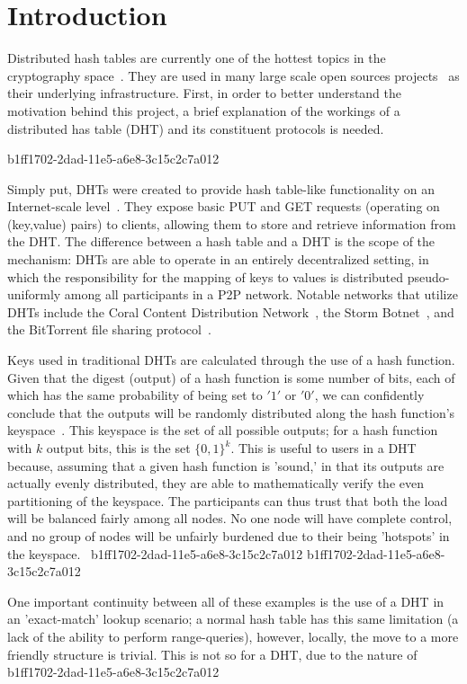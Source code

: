 \documentclass[12pt]{article}
\begin{document}
\section{Introduction}
\par Distributed hash tables are currently one of the hottest topics in the cryptography space~\cite{Stoica:2001dj,Rowstron:2001ea,Ratnasamy:2001wn}. They are used in many large scale open sources projects~\cite{Freitas:2013tb,Xu:2010vs,Perfitt:2010fh} as their underlying infrastructure. First, in order to better understand the motivation behind this project, a brief explanation of the workings of a distributed has table (DHT) and its constituent protocols is needed.

b1ff1702-2dad-11e5-a6e8-3c15c2c7a012\par Simply put, DHTs were created to provide hash table-like functionality on an Internet-scale level~\cite{Ratnasamy:2001wn}. They expose basic PUT and GET requests (operating on (key,value) pairs) to clients, allowing them to store and retrieve information from the DHT. The difference between a hash table and a DHT is the scope of the mechanism: DHTs are able to operate in an entirely decentralized setting, in which the responsibility for the mapping of keys to values is distributed pseudo-uniformly among all participants in a P2P network. Notable networks that utilize DHTs include the Coral Content Distribution Network~\cite{Freedman:2004vb}, the Storm Botnet~\cite{Holz:2008uk}, and the BitTorrent file sharing protocol~\cite{Cohen:y1_8mBnw}.

\par Keys used in traditional DHTs are calculated through the use of a hash function. Given that the digest (output) of a hash function is some number of bits, each of which has the same probability of being set to $'1'$ or $'0'$, we can confidently conclude that the outputs will be randomly distributed along the hash function's keyspace~. This keyspace is the set of all possible outputs; for a hash function with $k$ output bits, this is the set $\{0,1\}^k$. This is useful to users in a DHT because, assuming that a given hash function is 'sound,' in that its outputs are actually evenly distributed, they are able to mathematically verify the even partitioning of the keyspace. The participants can thus trust that both the load will be balanced fairly among all nodes. No one node will have complete control, and no group of nodes will be unfairly burdened due to their being 'hotspots' in the keyspace.~
b1ff1702-2dad-11e5-a6e8-3c15c2c7a012
b1ff1702-2dad-11e5-a6e8-3c15c2c7a012\par One important continuity between all of these examples is the use of a DHT in an 'exact-match' lookup scenario; a normal hash table has this same limitation (a lack of the ability to perform range-queries), however, locally, the move to a more friendly structure is trivial. This is not so for a DHT, due to the nature of
b1ff1702-2dad-11e5-a6e8-3c15c2c7a012\printbibliography
\end{document}
